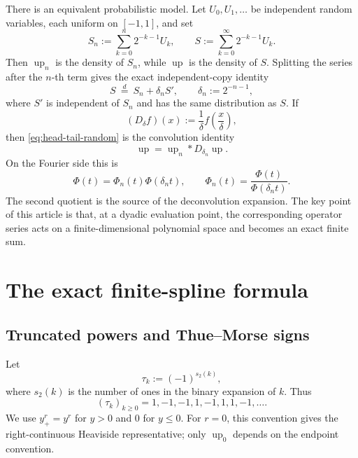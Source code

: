 \documentclass[11pt,oneside]{article}
\theoremstyle{definition}
\theoremstyle{remark}
\newcommand{\up}{\operatorname{up}}
\begin{document}
There is an equivalent probabilistic model.  Let \(U_0,U_1,\ldots\) be
independent random variables, each uniform on \([-1,1]\), and set
\begin{equation}\label{eq:random-sums}
 S_n:=\sum_{k=0}^{n}2^{-k-1}U_k,
 \qquad
 S:=\sum_{k=0}^{\infty}2^{-k-1}U_k.
\end{equation}
Then \(\up_n\) is the density of \(S_n\), while \(\up\) is the density of
\(S\).  Splitting the series after the \(n\)-th term gives the exact
independent-copy identity
\begin{equation}\label{eq:head-tail-random}
 S\ \stackrel{d}=\ S_n+\delta_nS',
 \qquad \delta_n:=2^{-n-1},
\end{equation}
where \(S'\) is independent of \(S_n\) and has the same distribution as
\(S\).  If
\begin{equation}\label{eq:dilation}
 (D_\delta f)(x):=\frac1\delta f\!\left(\frac{x}{\delta}\right),
\end{equation}
then \eqref{eq:head-tail-random} is the convolution identity
\begin{equation}\label{eq:tail-convolution}
 \boxed{\displaystyle \up=\up_n*D_{\delta_n}\up.}
\end{equation}
On the Fourier side this is
\begin{equation}\label{eq:tail-fourier}
 \Phi(t)=\Phi_n(t)\Phi(\delta_nt),
 \qquad
 \Phi_n(t)=\frac{\Phi(t)}{\Phi(\delta_nt)}.
\end{equation}
The second quotient is the source of the deconvolution expansion.  The key
point of this article is that, at a dyadic evaluation point, the corresponding
operator series acts on a finite-dimensional polynomial space and becomes an
exact finite sum.

\section{The exact finite-spline formula}

\subsection{Truncated powers and Thue--Morse signs}

Let
\begin{equation}\label{eq:tau-def}
 \tau_k:=(-1)^{s_2(k)},
\end{equation}
where \(s_2(k)\) is the number of ones in the binary expansion of \(k\).
Thus
\[
 (\tau_k)_{k\ge0}=1,-1,-1,1,-1,1,1,-1,\ldots.
\]
We use \(y_+^r=y^r\) for \(y>0\) and \(0\) for \(y\le0\).  For \(r=0\),
this convention gives the right-continuous Heaviside representative; only
\(\up_0\) depends on the endpoint convention.
\end{document}
